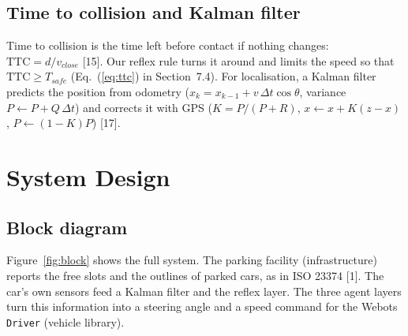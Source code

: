 \documentclass[12pt,a4paper]{article}
\begin{document}
\subsection{Time to collision and Kalman filter}
Time to collision is the time left before contact if nothing changes: $\text{TTC} = d / v_{close}$ [15]. Our reflex rule turns it around and limits the speed so that $\text{TTC} \ge T_{safe}$ (Eq.~(\ref{eq:ttc}) in Section~7.4). For localisation, a Kalman filter predicts the position from odometry ($x_k = x_{k-1} + v\,\Delta t\cos\theta$, variance $P \leftarrow P + Q\,\Delta t$) and corrects it with GPS ($K = P/(P+R)$, $x \leftarrow x + K(z - x)$, $P \leftarrow (1-K)P$) [17].

\section{System Design}
\subsection{Block diagram}
Figure~\ref{fig:block} shows the full system. The parking facility (infrastructure) reports the free slots and the outlines of parked cars, as in ISO 23374 [1]. The car's own sensors feed a Kalman filter and the reflex layer. The three agent layers turn this information into a steering angle and a speed command for the Webots \texttt{Driver} (vehicle library).
\end{document}
